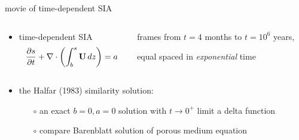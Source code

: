 \documentclass[hide notes,intlimits]{beamer}
\newcommand{\Div}{\nabla\cdot}
\begin{document}
\begin{frame}{movie of time-dependent SIA}

\begin{columns}
\begin{column}{0.4\textwidth}
\small
\begin{itemize}
\item time-dependent SIA
  $$\frac{\partial s}{\partial t} + \Div \left(\int_b^s {\bf U}\, dz \right) = a$$
\end{itemize}
\end{column}

\begin{column}{0.65\textwidth}
\vspace{-0.25in}

\begin{center}

\bigskip
\tiny
frames from $t=4$ months to $t = 10^6$ years,

equal spaced in \emph{exponential} time
\end{center}
\end{column}
\end{columns}


\begin{itemize}
\scriptsize
\item the Halfar (1983) similarity solution:
  \begin{itemize}
  \scriptsize
  \item[$\circ$] an exact $b=0,a=0$ solution with $t\to 0^+$ limit a delta function
  \item[$\circ$] compare Barenblatt solution of porous medium equation
  \end{itemize}
\end{itemize}
\end{frame}
\end{document}

